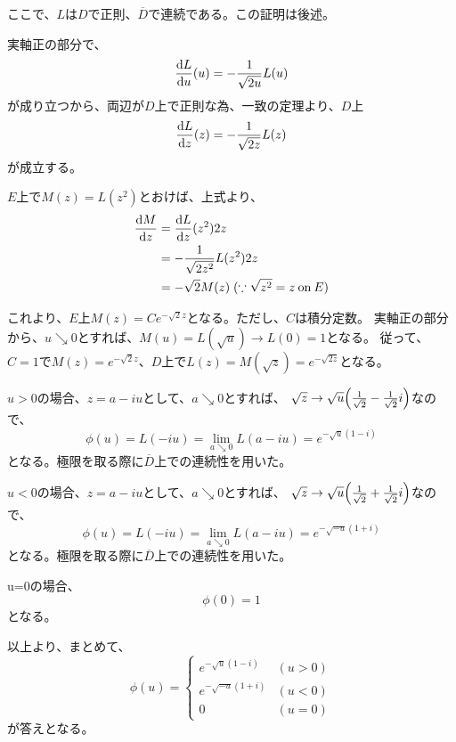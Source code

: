 \documentclass[a4paper, 10pt, dvipdfmx]{jlreq}
\begin{document}
ここで、$L$は$D$で正則、$\overline{D}$で連続である。この証明は後述。

実軸正の部分で、
\begin{equation*}
  \dv{L}{u} {}(u)=-\frac{1}{\sqrt{2u}}L(u)
\end{equation*}
が成り立つから、両辺が$D$上で正則な為、一致の定理より、$D$上
\begin{equation*}
  \dv{L}{z} {}(z)=-\frac{1}{\sqrt{2z}}L(z)
\end{equation*}
が成立する。

$E$上で$M(z)=L(z^2)$とおけば、上式より、
\begin{align*}
  \dv{M}{z}(z) & =\dv{L}{z}{}(z^2)2z                                          \\
               & =-\frac{1}{\sqrt{2z^2}}L(z^2)2z                              \\
               & = -\sqrt{2}M(z) \; (\because \sqrt{z^2}=z \: \text{on} \: E)
\end{align*}

これより、$E$上$M(z)=Ce^{-\sqrt{2}z}$となる。ただし、$C$は積分定数。
実軸正の部分から、$u\searrow0$とすれば、$M(u)=L(\sqrt{u}) \to L(0)=1$となる。
従って、$C=1$で$M(z)=e^{-\sqrt{2}z}$、$D$上で$L(z)=M(\sqrt{z})=e^{-\sqrt{2z}}$となる。

$u>0$の場合、$z=a-iu$として、$a\searrow0$とすれば、
$\sqrt{z} \to \sqrt{u} \qty(\frac{1}{\sqrt{2}}-\frac{1}{\sqrt{2}}i)$なので、
\begin{equation*}
  \phi(u)=L(-iu)=\lim_{a \searrow 0}L(a-iu)=e^{-\sqrt{u}(1-i)}
\end{equation*}
となる。極限を取る際に$\overline{D}$上での連続性を用いた。

$u<0$の場合、$z=a-iu$として、$a\searrow0$とすれば、
$\sqrt{z} \to \sqrt{u} \qty(\frac{1}{\sqrt{2}}+\frac{1}{\sqrt{2}}i)$なので、
\begin{equation*}
  \phi(u)=L(-iu)=\lim_{a \searrow 0}L(a-iu)=e^{-\sqrt{-u}(1+i)}
\end{equation*}
となる。極限を取る際に$\overline{D}$上での連続性を用いた。

u=0の場合、
\begin{equation*}
  \phi(0)=1
\end{equation*}
となる。

以上より、まとめて、
\begin{equation*}
  \phi(u)=\begin{cases}
    e^{-\sqrt{u}(1-i)}  & (u>0) \\
    e^{-\sqrt{-u}(1+i)} & (u<0) \\
    0                   & (u=0)
  \end{cases}
\end{equation*}
が答えとなる。
\end{document}
